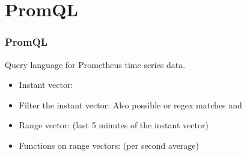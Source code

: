 \section{PromQL}
\begin{frame}
  \frametitle{PromQL} 
 
  Query language for Prometheus time series data.
 
  \begin{itemize}
    \item Instant vector:\\
    \item Filter the instant vector:
       Also possible \inlinecode{!=} or regex matches \inlinecode{=~} and \inlinecode{!~}
    \item Range vector: (last 5 minutes of the instant vector)\\
    \item Functions on range vectors: (per second average)\\
  \end{itemize}


\end{frame}
